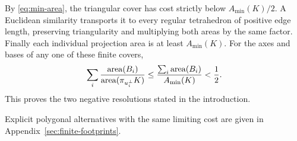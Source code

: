 By \eqref{eq:min-area}, the triangular cover has cost strictly
below $A_{\min}(K)/2$. A Euclidean similarity transports it to
every regular tetrahedron of positive edge length, preserving
triangularity and multiplying both areas by the same factor.
Finally each individual projection area is at least $A_{\min}(K)$.
For the axes and bases of any one of these finite covers,
\[
 \sum_i\frac{\operatorname{area}(B_i)}{\operatorname{area}(\pi_{u_i^\perp}K)}
 \le\frac{\sum_i\operatorname{area}(B_i)}{A_{\min}(K)}<\frac12.
\]
This proves the two negative resolutions stated in the introduction.

Explicit polygonal alternatives with the same limiting cost are given
in Appendix~\ref{sec:finite-footprints}.
